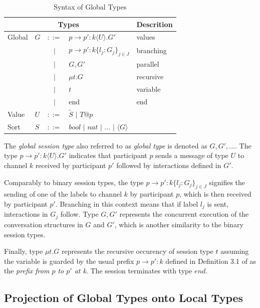 \begin{table}[H]
\center
\caption{Syntax of Global Types}
\begin{tabular}{|l|l c l|l|}
  \hline  
  \multicolumn{4}{|c|}{Types} 																	&	Descrition \\
  \hline  
  Global &	$G$ &	$::=$	& $p \rightarrow p' : k \langle U \rangle . G'$ 					& 	values	 	\\
  		 &		&	$|$		& $p \rightarrow p' : k \lbrace l_{j}:G_{j} \rbrace _{j \in J} $ 	& 	branching 	\\
  		 &		&	$|$		& $G,G' $ 															& 	parallel 	\\
  		 &		&	$|$		& $\mu t.G $ 														& 	recursive 	\\
  		 &		&	$|$		& $t$ 																& 	variable 	\\
  		 &		&	$|$		& end																& 	end		 	\\
  Value	 &	$U$ &	$::=$	& $\tilde{S}$ $|$ $T@p$							 					& 			 	\\
  Sort	 &	$S$ &	$::=$	& $bool$ $|$ $nat$ $|$ ${...}$ $|$ $\langle G \rangle$				& 			 	\\	  
  \hline
\end{tabular}
\label{TBglobtypesynt}
\end{table}

The \textit{global session type} also referred to as \textit{global type} is denoted as $G,G',...$. The type  $p \rightarrow p' : k \langle U \rangle . G'$ indicates that participant $p$ sends a message of type $U$ to channel $k$ received by participant $p'$ followed by interactions defined in $G'$. 

Comparably to binary session types, the type $p \rightarrow p' : k \lbrace l_{j}:G_{j} \rbrace _{j \in J} $ signifies the sending of one of the labels to channel $k$ by participant $p$, which is then received by participant $p'$. Branching in this context means that if label $l_{j}$ is sent, interactions in $G_{j}$ follow.
Type $G, G'$ represents the concurrent execution of the conversation structures in $G$ and $G'$, which is another similarity to the binary session types.

Finally, type $\mu t.G $ represents the recursive occurency of session type $t$ assuming the variable is guarded by the usual prefix $p \rightarrow p' : k $ defined in Definition 3.1 of \cite{multiparty_sess_types} as the \textit{prefix from $p$ to $p'$ at k}. The session terminates with type $end$.

\subsection{Projection of Global Types onto Local Types}

